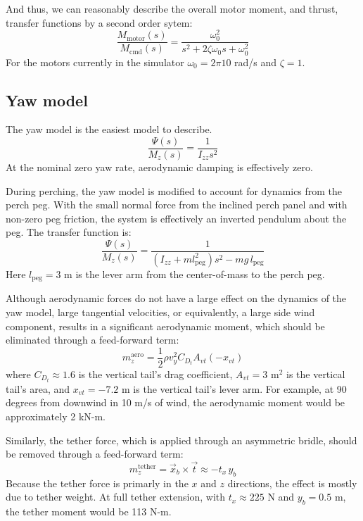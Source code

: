 \documentclass[11pt]{amsart}
\begin{document}
And thus, we can reasonably describe the overall motor moment, and
thrust, transfer functions by a second order sytem:
\begin{equation}
\frac{M_{\mathrm{motor}}(s)}{M_{\mathrm{cmd}}(s)} =
\frac{\omega_0^2}{s^2 + 2 \zeta \omega_0 s + \omega_0^2}
\end{equation}
For the motors currently in the simulator $\omega_0 = 2 \pi 10$ rad/s and
$\zeta = 1$.

\subsection{Yaw model}

The yaw model is the easiest model to describe.
\begin{equation}
\frac{\Psi(s)}{M_z(s)} = \frac{1}{I_{zz} s^2}
\end{equation}
At the nominal zero yaw rate, aerodynamic damping is effectively zero.

During perching, the yaw model is modified to account for dynamics
from the perch peg.  With the small normal force from the inclined
perch panel and with non-zero peg friction, the system is effectively
an inverted pendulum about the peg.  The transfer function is:
\begin{equation}
\frac{\Psi(s)}{M_z(s)} =
\frac{1}{(I_{zz} + m l_{\mathrm{peg}}^2) s^2 - m g\, l_{\mathrm{peg}}}
\end{equation}
Here $l_{\mathrm{peg}} = 3$ m is the lever arm from the center-of-mass
to the perch peg.

Although aerodynamic forces do not have a large effect on the dynamics
of the yaw model, large tangential velocities, or equivalently, a
large side wind component, results in a significant aerodynamic
moment, which should be eliminated through a feed-forward term:
\begin{equation}
m^{\mathrm{aero}}_z = \frac{1}{2} \rho v_y^2 C_{D_t} A_{vt} (-x_{vt})
\end{equation}
where $C_{D_t} \approx 1.6$ is the vertical tail's drag coefficient,
$A_{vt} = 3$ m$^2$ is the vertical tail's area, and $x_{vt} = -7.2$ m
is the vertical tail's lever arm.  For example, at 90 degrees from
downwind in 10 m/s of wind, the aerodynamic moment would be
approximately 2 kN-m.

Similarly, the tether force, which is applied through an asymmetric
bridle, should be removed through a feed-forward term:
\begin{equation}
m^{\mathrm{tether}}_z = \vec{x}_b \times \vec{t} \approx -t_x\, y_b
\end{equation}
Because the tether force is primarly in the $x$ and $z$ directions,
the effect is mostly due to tether weight.  At full tether extension,
with $t_x \approx 225$ N and $y_b = 0.5$ m, the tether moment would be
113 N-m.
\end{document}
